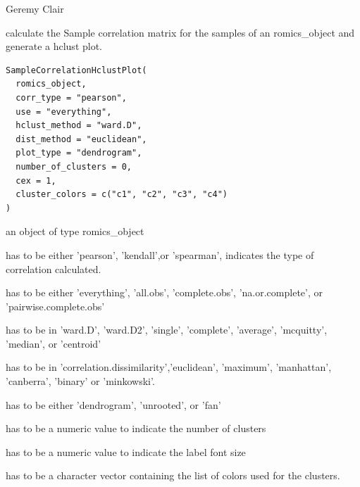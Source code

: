 \documentclass[a4paper]{book}
\begin{document}
%
\begin{Author}
Geremy Clair
\end{Author}
%
\begin{Description}
calculate the Sample correlation matrix for the samples of an romics\_object and generate a hclust plot.
\end{Description}
%
\begin{Usage}
\begin{verbatim}
SampleCorrelationHclustPlot(
  romics_object,
  corr_type = "pearson",
  use = "everything",
  hclust_method = "ward.D",
  dist_method = "euclidean",
  plot_type = "dendrogram",
  number_of_clusters = 0,
  cex = 1,
  cluster_colors = c("c1", "c2", "c3", "c4")
)
\end{verbatim}
\end{Usage}
%
\begin{Arguments}
\begin{ldescription}
\item[\code{romics\_object}] an object of type romics\_object

\item[\code{corr\_type}] has to be either 'pearson', 'kendall',or 'spearman', indicates the type of correlation calculated.

\item[\code{use}] has to be either 'everything', 'all.obs', 'complete.obs', 'na.or.complete', or 'pairwise.complete.obs'

\item[\code{hclust\_method}] has to be in 'ward.D', 'ward.D2', 'single', 'complete', 'average', 'mcquitty', 'median', or 'centroid'

\item[\code{dist\_method}] has to be in 'correlation.dissimilarity','euclidean', 'maximum', 'manhattan', 'canberra', 'binary' or 'minkowski'.

\item[\code{plot\_type}] has to be either 'dendrogram', 'unrooted', or 'fan'

\item[\code{number\_of\_clusters}] has to be a numeric value to indicate the number of clusters

\item[\code{cex}] has to be a numeric value to indicate the label font size

\item[\code{cluster\_colors}] has to be a character vector containing the list of colors used for the clusters.
\end{ldescription}
\end{Arguments}
\end{document}
